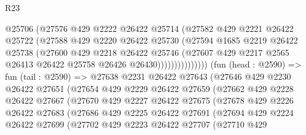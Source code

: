 \begin{lexlean}{R23}
\begin{coremodule}
                          @25706
                          (@27576
                            @429
                            @2222
                            @26422
                            @25714
                            (@27582
                              @429
                              @2221
                              @26422
                              @25722
                              (@27588
                                @429
                                @2220
                                @26422
                                @25730
                                (@27594
                                  @1685
                                  @2219
                                  @26422
                                  @25738
                                  (@27600
                                    @429
                                    @2218
                                    @26422
                                    @25746
                                    (@27607
                                      @429
                                      @2217
                                      @2565
                                      @26413
                                      @26422
                                      @25758
                                      @26426
                                      @26430)))))))))))))))
        (fun (head : @2590) =>
        fun (tail : @2590) =>
        @27638
          @2231
          @26422
          @27643
          (@27646
            @429
            @2230
            @26422
            @27651
            (@27654
              @429
              @2229
              @26422
              @27659
              (@27662
                @429
                @2228
                @26422
                @27667
                (@27670
                  @429
                  @2227
                  @26422
                  @27675
                  (@27678
                    @429
                    @2226
                    @26422
                    @27683
                    (@27686
                      @429
                      @2225
                      @26422
                      @27691
                      (@27694
                        @429
                        @2224
                        @26422
                        @27699
                        (@27702
                          @429
                          @2223
                          @26422
                          @27707
                          (@27710
                            @429

\end{coremodule}
\end{lexlean}
